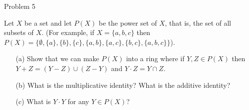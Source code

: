 \documentclass{hmwk}
\begin{document}
\begin{problem}{Problem 5}

\pre Let $X$ be a set and let $P(X)$ be the power set of $X$, that is, the set of all subsets of $X$.  (For example, if $X = \{ a, b, c\}$ then $P(X) = \{ \emptyset, \{a\}, \{b \}, \{c\}, \{a, b\}, \{a, c\}, \{b, c \}, \{a, b, c\}\}$).  

\begin{itemize}
	\item[(a)]  Show that we can make $P(X)$ into a ring where if $Y,Z \in P(X)$ then $Y + Z = (Y - Z) \cup (Z - Y)$ and $Y \cdot Z = Y \cap Z.$  
	\item[(b)] What is the multiplicative identity? What is the additive identity?  
	\item[(c)] What is $Y \cdot Y$ for any $Y\in P(X)$?
\end{itemize}
\end{problem}
\end{document}
